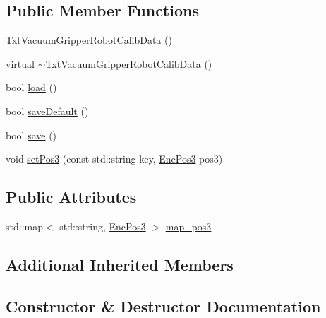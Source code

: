 \subsection*{Public Member Functions}
\begin{DoxyCompactItemize}
\item 
\hyperlink{classft_1_1_txt_vacuum_gripper_robot_calib_data_aed8c2533b86fe9a64e01db765e9d5515}{Txt\+Vacuum\+Gripper\+Robot\+Calib\+Data} ()
\item 
virtual \hyperlink{classft_1_1_txt_vacuum_gripper_robot_calib_data_ae9f3a034aad9ef628c0ac34f967aad16}{$\sim$\+Txt\+Vacuum\+Gripper\+Robot\+Calib\+Data} ()
\item 
bool \hyperlink{classft_1_1_txt_vacuum_gripper_robot_calib_data_a18a67b8766e89e205620d950b785afd4}{load} ()
\item 
bool \hyperlink{classft_1_1_txt_vacuum_gripper_robot_calib_data_a620eb825a421524b94c78fb1f0db4a6c}{save\+Default} ()
\item 
bool \hyperlink{classft_1_1_txt_vacuum_gripper_robot_calib_data_ae22aff2c5d480a15b6ea0b8f0ec71dc6}{save} ()
\item 
void \hyperlink{classft_1_1_txt_vacuum_gripper_robot_calib_data_aa0b74a616686597c8f9606473ba0b8e5}{set\+Pos3} (const std\+::string key, \hyperlink{classft_1_1_enc_pos3}{Enc\+Pos3} pos3)
\end{DoxyCompactItemize}
\subsection*{Public Attributes}
\begin{DoxyCompactItemize}
\item 
std\+::map$<$ std\+::string, \hyperlink{classft_1_1_enc_pos3}{Enc\+Pos3} $>$ \hyperlink{classft_1_1_txt_vacuum_gripper_robot_calib_data_afadb6acfa1b8237a311ca014a7e33211}{map\+\_\+pos3}
\end{DoxyCompactItemize}
\subsection*{Additional Inherited Members}


\subsection{Constructor \& Destructor Documentation}
